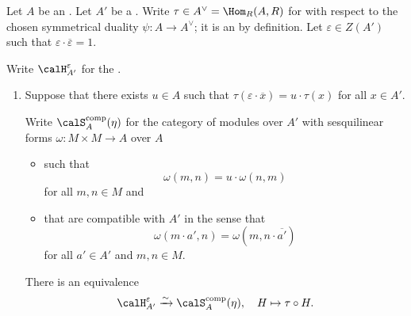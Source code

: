 \begin{theorem} \label{theorem:equivalence_of_hermitian_forms_on_a_symmetric_algebra_with_involution_over_an_involution_ring_with_sesquilinear_forms_on_the_base_ring}

    Let $A$ be an . Let $A'$ be a . Write $\tau \in A^\vee = \Hom_R(A,R)$ for  with respect to the chosen symmetrical duality $\psi: A \to A^\vee$; it is an  by definition. Let $\varepsilon \in Z(A')$ such that $\varepsilon \cdot \overline{\varepsilon} = 1$. 


   

   Write $\calH_{A'}^\varepsilon$ for the . 
   \begin{enumerate}
    \item Suppose that there exists $u \in A$ such that $\tau(\varepsilon \cdot \overline{x}) = u \cdot \tau(x)$ for all $x \in A'$. 

    Write $\calS_{A}^{\text{comp}}(\eta)$ for the category of modules over $A'$ with sesquilinear forms $\omega: M \times M \to A$ over $A$
    \begin{itemize}
        \item such that 
        $$\omega(m,n) = u \cdot \omega(n,m)$$ for all $m,n \in M$
        and 
        \item that are compatible with $A'$ in the sense that
        $$\omega(m \cdot a', n) = \omega(m, n \cdot \overline{a'})$$
        for all $a' \in A'$ and $m,n \in M$.
    \end{itemize}
    There is an equivalence
    $$\calH_{A'}^\varepsilon \xrightarrow{\sim} \calS_{A}^{\text{comp}}(\eta), \quad H \mapsto \tau \circ H.$$


\end{enumerate}
\end{theorem}
